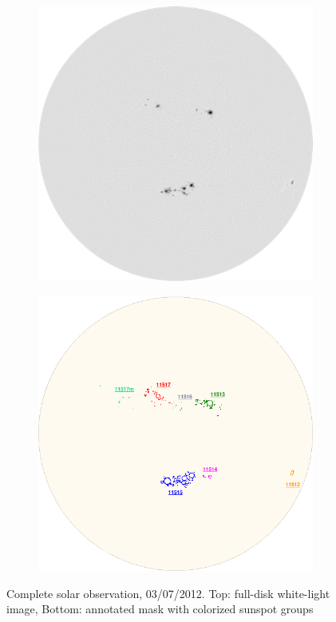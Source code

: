 \begin{figure}[h!]
    \centering
    \captionsetup{justification=centering}
    \begin{subfigure}[t]{0.45\textheight}
        \includegraphics[width=\textwidth]{./pictures/groups-white-light}
    \end{subfigure}\vspace{3mm}
    \begin{subfigure}[t]{0.45\textheight}
        \includegraphics[width=\textwidth]{./pictures/groups-annotation}
    \end{subfigure}
    \caption{Complete solar observation, 03/07/2012. Top: full-disk white-light image, Bottom: annotated mask with colorized sunspot groups}\label{fig:annotated-mask}
\end{figure}
